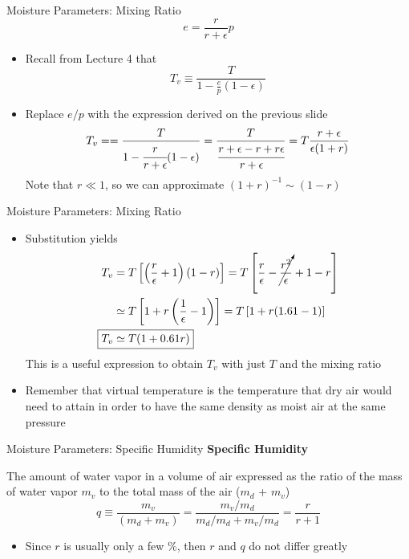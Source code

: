 
\begin{frame}{Moisture Parameters: Mixing Ratio}
$$e= \frac{r}{r+\epsilon}p$$
\begin{itemize}
	\item Recall from Lecture 4 that
	$$T_v \equiv \frac{T}{1 - \frac{e}{p}(1-\epsilon)}$$
	\item Replace $e/p$ with the expression derived on the previous slide
	$$T_v == \frac{T}{1 - \cfrac{r}{r+\epsilon}(1-\epsilon)}=\frac{T}{\cfrac{r+\epsilon-r+r\epsilon}{r+\epsilon}}=T\frac{r+\epsilon}{\epsilon(1+r)}$$
	Note that $r\ll1$, so we can approximate $(1+r)^{-1}\sim (1-r)$
\end{itemize}
\end{frame}


\begin{frame}{Moisture Parameters: Mixing Ratio}
\begin{itemize}
	\item Substitution yields
	\begin{align*}
	T_v &= T\left[\left(\frac{r}{\epsilon} + 1\right)(1-r)\right] = T\left[\frac{r}{\epsilon} -\cancelto{ }{\frac{r^2}{\epsilon}} +1 -r\right] \\
	&\simeq T\left[1 + r\left(\frac{1}{\epsilon} -1\right)\right] = T\left[1 + r(1.61-1)\right]\\
	\Aboxed{T_v&\simeq T(1+0.61r)}
	\end{align*}
	This is a useful expression to obtain $T_v$ with just $T$ and the mixing ratio
	\item Remember that virtual temperature is the temperature that dry air would need to attain in order to have the same density as moist air at the same pressure	
\end{itemize}
\end{frame}



\begin{frame}{Moisture Parameters: Specific Humidity}
\textbf{Specific Humidity}
\begin{fancydefs}
	The amount of water vapor in a volume of air expressed as the ratio of the mass of water vapor $m_v$ to the total mass of the air ($m_d$ + $m_v$)
	$$q \equiv \frac{m_v}{(m_d+m_v)} = \frac{m_v/m_d}{m_d/m_d + m_v/m_d} = \frac{r}{r+1}$$
\end{fancydefs}
\begin{itemize}
	\item Since $r$ is usually only a few $\%$, then $r$ and $q$ do not differ greatly
\end{itemize}
\end{frame}

